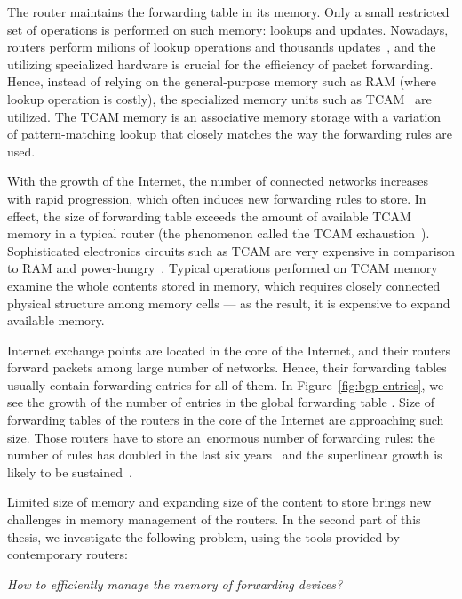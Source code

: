 The router maintains the forwarding table in its memory.
Only a small restricted set of operations is performed on such memory: lookups and updates.
Nowadays, routers perform milions of lookup operations and thousands updates~\cite{bgp-updates}, and the utilizing specialized hardware is crucial for the efficiency of packet forwarding.
Hence, instead of relying on the general-purpose memory such as RAM (where lookup operation is costly), the specialized memory units such as TCAM~\cite{tcam-memory} are utilized.
The TCAM memory is an associative memory storage with a variation of pattern-matching lookup that closely matches the way the forwarding rules are used.

With the growth of the Internet, the number of connected networks increases with rapid progression, which often induces new forwarding rules to store.
In effect, the size of forwarding table exceeds the amount of available TCAM memory in a typical router (the phenomenon called the TCAM exhaustion~\cite{tcam-exhaust}).
Sophisticated electronics circuits such as TCAM are very expensive in comparison to RAM and
power-hungry~\cite{tcam-expensive}.
Typical operations performed on TCAM memory examine the whole contents stored in memory, which requires closely connected physical structure among memory cells --- as the result, it is expensive to expand available memory.

Internet exchange points are located in the core of the Internet, and their routers forward packets among large number of networks.
Hence, their forwarding tables usually contain forwarding entries for all of them.
In Figure~\ref{fig:bgp-entries}, we see the growth of the number of entries in the global forwarding table \cite{url-bgp-entries}.
Size of forwarding tables of the routers in the core of the Internet are approaching such size.
Those routers have to store an~enormous number of forwarding rules: the
number of rules has doubled in the last six years~\cite{bgp-routeviews} and
the superlinear growth is likely to be sustained~\cite{steve-myth}.


Limited size of memory and expanding size of the content to store brings new challenges in memory management of the routers.
In the second part of this thesis, we investigate the following problem, using the tools provided by contemporary routers:
\begin{center}
  \emph{How to efficiently manage the memory of forwarding devices?}
\end{center}


